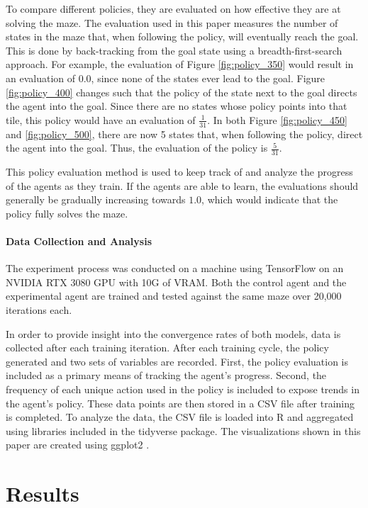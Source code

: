 \documentclass[12pt,letterpaper]{article}
\begin{document}
To compare different policies, they are evaluated on how effective they are at solving the maze.
The evaluation used in this paper measures the number of states in the maze that, when following the policy, will eventually reach the goal.
This is done by back-tracking from the goal state using a breadth-first-search approach.
For example, the evaluation of Figure \ref{fig:policy_350} would result in an evaluation of $0.0$, since none of the states ever lead to the goal.
Figure \ref{fig:policy_400} changes such that the policy of the state next to the goal directs the agent into the goal.
Since there are no states whose policy points into that tile, this policy would have an evaluation of $\frac{1}{31}$.
In both Figure \ref{fig:policy_450} and \ref{fig:policy_500}, there are now 5 states that, when following the policy, direct the agent into the goal.
Thus, the evaluation of the policy is $\frac{5}{31}$.

This policy evaluation method is used to keep track of and analyze the progress of the agents as they train.
If the agents are able to learn, the evaluations should generally be gradually increasing towards $1.0$, which would indicate that the policy fully solves the maze.



\paragraph{Data Collection and Analysis}
The experiment process was conducted on a machine using TensorFlow \cite{lib_tensorflow} on an NVIDIA RTX 3080 GPU with 10G of VRAM.
Both the control agent and the experimental agent are trained and tested against the same maze over 20,000 iterations each.

In order to provide insight into the convergence rates of both models, data is collected after each training iteration.
After each training cycle, the policy generated and two sets of variables are recorded.
First, the policy evaluation is included as a primary means of tracking the agent's progress.
Second, the frequency of each unique action used in the policy is included to expose trends in the agent's policy.
These data points are then stored in a CSV file after training is completed.
To analyze the data, the CSV file is loaded into R \cite{lang_r} and aggregated using libraries included in the tidyverse \cite{lib_tidyverse} package.
The visualizations shown in this paper are created using ggplot2 \cite{lib_ggplot2}.

\section{Results}
\end{document}
